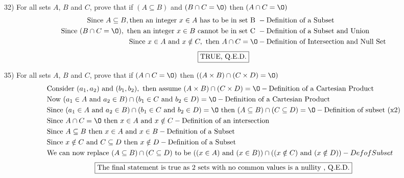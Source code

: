 \documentclass[11pt]{article}
\newcommand*{\mybox}[1]{\framebox{#1}}
\begin{document}
\begin{flushleft}
32) For all sets $A$, $B$ and $C$, prove that if $(A\subseteq B)$ and $( B\cap C = \O)$ then $(A\cap C = \O)$
\vspace{-3mm}
\begin{align*}
\text{Since } A\subseteq B, \text{then an integer }x \in A \text{ has to be in set B }&- \text{Definition of a Subset}\\
\text{Since } (B\cap C = \O), \text{ then an integer }x \in B \text{ cannot be in set C }&- \text{Definition of a Subset and Union}\\
\text{Since } x \in A \text{ and }x \notin C,  \text{ then } A\cap C = \O &- \text{Definition of Intersection and Null Set}
\end{align*}
\vspace{-5mm}
$$\text{\mybox{TRUE, Q.E.D.}}$$


\hrulefill

35) For all sets $A$, $B$ and $C$, prove that if $(A\cap C = \O)$ then $((A\times B)\cap (C\times D) = \O)$
\vspace{-3mm}
\begin{align*}
&\text{Consider } (a_1, a_2) \text{ and } (b_1, b_2), \text{ then  }\text{assume }(A\times B)\cap (C\times D)  = \O - \text{Definition of a Cartesian Product}\\
&\text{Now }(a_1 \in A \text{ and }a_2 \in B)\cap (b_1 \in C \text{ and } b_2 \in D) = \O - \text{Definition of a Cartesian Product}\\
&\text{Since } (a_1 \in A \text{ and }a_2 \in B)\cap (b_1 \in C \text{ and } b_2 \in D)=\O \text{ then } (A\subseteq B)\cap (C\subseteq D) = \O - \text{Definition of subset (x2)}\\
& \text{Since }A \cap C = \O \text{ then } x\in A\text{ and }x\notin C - \text{Definition of an intersection}\\
& \text{Since }A\subseteq B \text{ then } x\in A \text{ and } x\in B - \text{Definition of a Subset}\\
& \text{Since }x\notin C \text{ and } C\subseteq D \text{ then } x\notin D - \text{Definition of a Subset}\\
&\text{We can now replace }(A\subseteq B)\cap (C\subseteq D) \text{ to be }((x\in A) \text{ and }(x\in B))\cap ((x\notin C)\text{ and }(x\notin D)) - Def of Subset
\end{align*}
\vspace{-5mm}
$$\text{\mybox{The final statement is true as 2 sets with no common values is a nullity , Q.E.D.}}$$



\hrulefill
\newpage
\end{flushleft}
\end{document}

